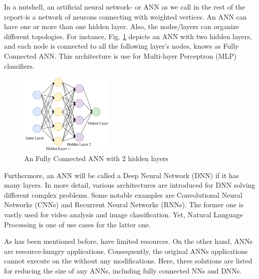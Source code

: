 In a nutshell, an artificial neural network- or ANN as we call in the rest of the report-is a network of neurons connecting with weighted vertices. An ANN can have one or more than one hidden layer. Also, the nodes/layers can organize different topologies. For instance, Fig. \ref{fcnn} depicts an ANN with two hidden layers, and each node is connected to all the following layer's nodes, knows as Fully Connected ANN. This architecture is use for Multi-layer Perceptron (MLP) classifiers.
\par
\begin{figure}[ht!]
\centering
\includegraphics[width=0.4\textwidth]{./figs/fc.pdf}
\caption{An Fully Connected ANN with 2 hidden layers}
\label{fcnn}
\end{figure}
\par
Furthermore, an ANN will be called a Deep Neural Network (DNN) if it has many layers. In more detail, various architectures are introduced for DNN solving different complex problems. Some notable examples are Convolutional Neural Networks (CNNs) and Recurrent Neural Networks (RNNs). The former one is vastly used for video analysis and image classification. Yet, Natural Language Processing is one of use cases for the latter one. 
\par
As has been mentioned before, \smartnics have limited resources. On the other hand, ANNs are resource-hungry applications. Consequently, the original ANNs applications cannot execute on the \smartnics without any modifications. Here, three solutions are listed for reducing the size of any ANNs, including fully connected NNs and DNNs.
